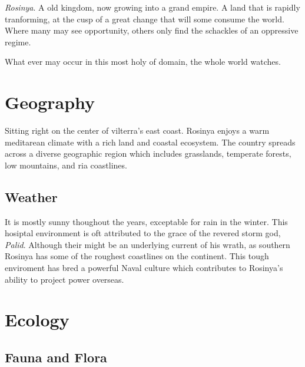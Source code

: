 \documentclass[../main.tex]{subfiles}
\begin{document}

\emph{Rosinya}. A old kingdom, now growing into a grand empire. A land that is rapidly tranforming, 
at the cusp of a great change that will some consume the world. 
Where many may see opportunity, others only find the schackles of an oppressive regime.

What ever may occur in this most holy of domain, the whole world watches. 



\section{Geography} 
Sitting right on the center of vilterra's east coast. Rosinya enjoys a warm meditarean climate
with a rich land and coastal ecosystem. The country spreads across a diverse geographic
region which includes grasslands, temperate forests, low mountains, and ria coastlines.

\subsection{Weather} 
It is mostly sunny thoughout the years, exceptable for rain in the winter. 
This hosiptal environment is oft attributed to the grace of the revered 
storm god, \emph{Palid}. Although their might be an underlying current of his wrath,
as southern Rosinya has some of the roughest coastlines on the continent.
This tough enviroment has bred a powerful Naval culture which contributes 
to Rosinya's ability to project power overseas. 



\section{Ecology}

\subsection{Fauna and Flora}
\end{document}
